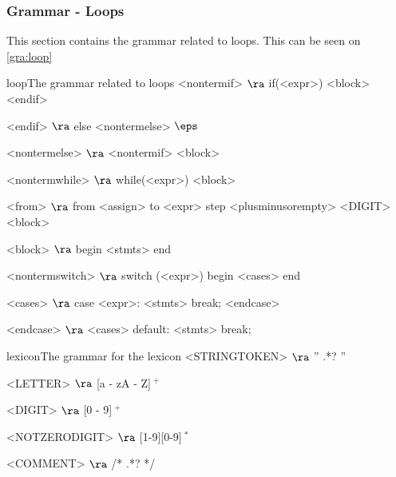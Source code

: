 \subsubsection{Grammar - Loops}
This section contains the grammar related to loops. This can be seen on \ref{gra:loop}
\begin{grammatik}{loop}{The grammar related to loops}
<nontermif> $\ra$ if(<expr>)
	<block>
	<endif>

<endif> $\ra$ 
	else <nontermelse>
	\alt$\eps$

<nontermelse> $\ra$ <nontermif>
	\alt <block>

<nontermwhile> $\ra$ while(<expr>)
		<block>
		
<from> $\ra$ from <assign> to <expr> step <plusminusorempty> <DIGIT>
	<block>

<block> $\ra$ 
	begin
		<stmts>
	end

<nontermswitch> $\ra$ switch (<expr>)
		begin
			<cases>
		end

<cases> $\ra$ case <expr>:
			<stmts>
			break; 
		<endcase>
		
<endcase> $\ra$ <cases>
		\alt default:
			<stmts>
			break;

\end{grammatik}


\begin{grammatik}{lexicon}{The grammar for the lexicon}
<STRINGTOKEN> $\ra$ '' .*? '' 

<LETTER> $\ra$ [a - zA - Z]$~^+$

<DIGIT> $\ra$ [0 - 9]$~^+$

<NOTZERODIGIT> $\ra$ [1-9][0-9]$~^*$

<COMMENT> $\ra$ /* .*? */


\end{grammatik}